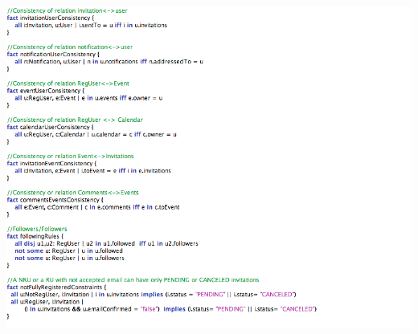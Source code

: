 \documentclass[12pt]{book}
\begin{document}
\includegraphics[width=19cm,height=21cm]{Alloy6}\\
\newpage
\end{document}
